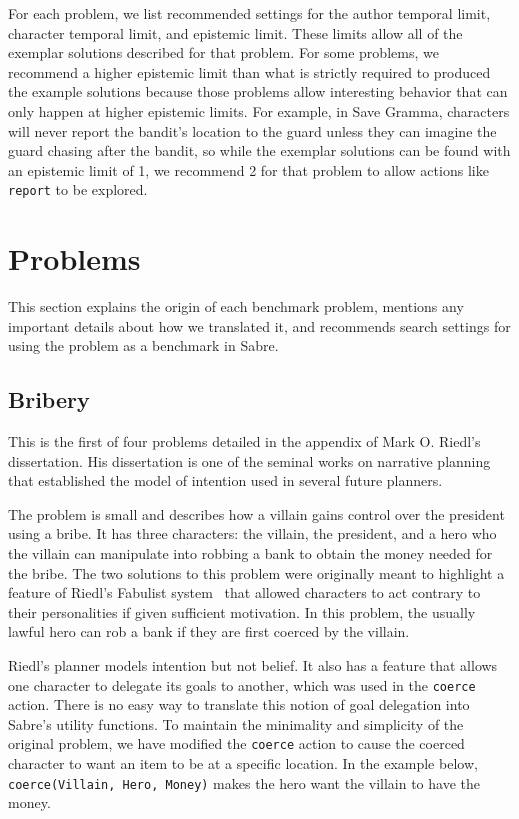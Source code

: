 \documentclass{nilreport}
\makeatletter
\renewcommand{\bibentry}[1]{\nocite{#1}{\frenchspacing\@nameuse{BR@r@#1\@extra@b@citeb}}}
\makeatother
\begin{document}
For each problem, we list recommended settings for the author temporal
limit, character temporal limit, and epistemic limit. These limits
allow all of the exemplar solutions described for that problem. For
some problems, we recommend a higher epistemic limit than what is
strictly required to produced the example solutions because those
problems allow interesting behavior that can only happen at higher
epistemic limits. For example, in Save Gramma, characters will never
report the bandit's location to the guard unless they can imagine
the guard chasing after the bandit, so while the exemplar solutions
can be found with an epistemic limit of 1, we recommend 2 for that
problem to allow actions like \texttt{report} to be explored.

\section{Problems}

This section explains the origin of each benchmark problem, mentions
any important details about how we translated it, and recommends search
settings for using the problem as a benchmark in Sabre.

\subsection{Bribery}

This is the first of four problems detailed in the appendix of Mark
O. Riedl's dissertation. His dissertation is one of the seminal works
on narrative planning that established the model of intention used
in several future planners.

\begin{quote}
	\bibentry{riedl2004thesis}
\end{quote}

\noindent The problem is small and describes how a villain gains control
over the president using a bribe. It has three characters: the villain,
the president, and a hero who the villain can manipulate into robbing
a bank to obtain the money needed for the bribe. The two solutions
to this problem were originally meant to highlight a feature of Riedl's
Fabulist system~\cite{riedl2006story} that allowed characters to
act contrary to their personalities if given sufficient motivation.
In this problem, the usually lawful hero can rob a bank if they are
first coerced by the villain.

Riedl's planner models intention but not belief. It also has a feature
that allows one character to delegate its goals to another, which
was used in the \texttt{coerce} action. There is no easy way to translate
this notion of goal delegation into Sabre's utility functions. To
maintain the minimality and simplicity of the original problem, we
have modified the \texttt{coerce} action to cause the coerced character
to want an item to be at a specific location. In the example below,
\texttt{coerce(Villain, Hero, Money)} makes the hero want the villain
to have the money.
\end{document}
